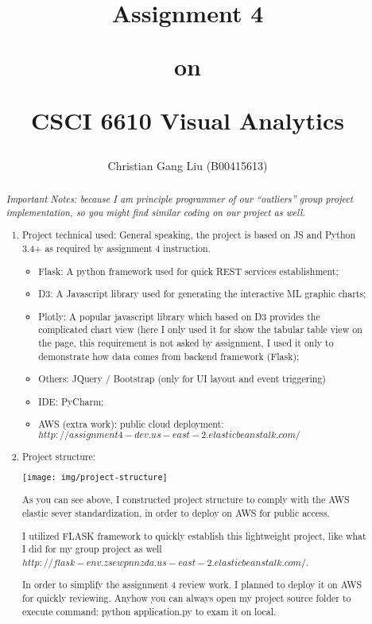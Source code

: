 \documentclass[]{report}
\title{Assignment 4
	
	on
	
	CSCI 6610 Visual Analytics
}
\author{Christian Gang Liu (B00415613)}
\begin{document}
\maketitle

\begin{abstract}
	
{\em Important Notes: because I am principle programmer of our “outliers” group project implementation, so you might find similar coding on our project as well. }

\begin{enumerate}
\item Project technical used:
General speaking, the project is based on JS and Python 3.4+ as required by assignment 4 instruction.
\begin{itemize}
\item Flask: A python framework used for quick REST services establishment;
\item D3: A Javascript library used for generating the interactive ML graphic charts;
\item Plotly: A popular javascript library which based on D3 provides the complicated chart view (here I only used it for show the tabular table view on the page, this requirement is not asked by assignment, I used it only to demonstrate how data comes from backend framework (Flask);
\item Others: JQuery / Bootstrap (only for UI layout and event triggering) 
\item IDE: PyCharm;
\item AWS (extra work): public cloud deployment:$http://assignment4-dev.us-east-2.elasticbeanstalk.com/$
\end{itemize}

\item Project structure: 

\texttt{[image: img/project-structure]}

As you can see above, I constructed project structure to comply with the AWS elastic sever standardization, in order to deploy on AWS for public access.

I utilized FLASK framework to quickly establish this lightweight project, like what I did for my group project as well  $http://flask-env.zsewpnnzda.us-east-2.elasticbeanstalk.com/$.

In order to simplify the assignment 4 review work. I planned to deploy it on AWS for quickly reviewing. Anyhow you can always open my project source folder to execute command: python application.py to exam it on local.


\end{enumerate}
\end{abstract}
\end{document}

